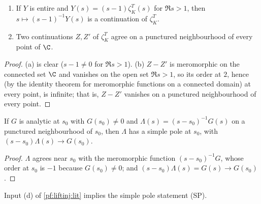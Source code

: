 \begin{lemma}\label{pf:liftinj:zetacont}
\begin{enumerate}[label=(\alph*)]
\item If $Y$ is entire and $Y(s)=(s-1)\zeta^T_K(s)$ for $\Re s>1$, then $s\mapsto(s-1)^{-1}Y(s)$ is a
continuation of $\zeta^T_K$.
\item Two continuations $Z,Z'$ of $\zeta^T_K$ agree on a punctured neighbourhood of every point of $\C$.
\end{enumerate}
\end{lemma}

\begin{proof}
(a) is clear ($s-1\ne0$ for $\Re s>1$). (b) $Z-Z'$ is meromorphic on the connected set $\C$ and vanishes on the open
set $\Re s>1$, so its order at $2$, hence (by the identity theorem for meromorphic functions on a connected
domain) at every point, is infinite; that is, $Z-Z'$ vanishes on a punctured neighbourhood of every point.
\end{proof}

\begin{lemma}\label{pf:liftinj:spcrit}
If $G$ is analytic at $s_0$ with $G(s_0)\ne0$ and $\Lambda(s)=(s-s_0)^{-1}G(s)$ on a punctured neighbourhood of
$s_0$, then $\Lambda$ has a simple pole at $s_0$, with $(s-s_0)\Lambda(s)\to G(s_0)$.
\end{lemma}

\begin{proof}
$\Lambda$ agrees near $s_0$ with the meromorphic function $(s-s_0)^{-1}G$, whose order at $s_0$ is $-1$ because
$G(s_0)\ne0$; and $(s-s_0)\Lambda(s)=G(s)\to G(s_0)$.
\end{proof}

\begin{proposition}\label{pf:liftinj:pole}
Input (d) of \cref{pf:liftinj:lit} implies the simple pole statement (SP).
\end{proposition}

